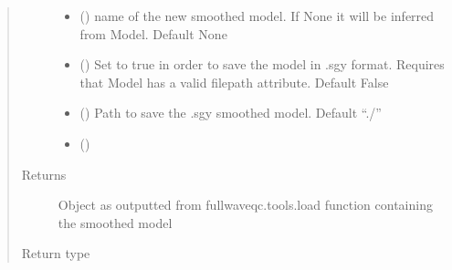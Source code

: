\documentclass[letterpaper,10pt,english]{sphinxmanual}
\begin{document}
\begin{fulllineitems}
\begin{quote}
\begin{description}
\begin{itemize}
\item {} 
 (\sphinxstyleliteralemphasis{\sphinxupquote{, }}) \textendash{} name of the new smoothed model. If None it will be inferred from Model.
Default None

\item {} 
 (\sphinxstyleliteralemphasis{\sphinxupquote{, }}) \textendash{} Set to true in order to save the model in .sgy format. Requires that Model
has a valid filepath attribute. Default False

\item {} 
 (\sphinxstyleliteralemphasis{\sphinxupquote{, }}) \textendash{} Path to save the .sgy smoothed model. Default “./”

\item {} 
 (\sphinxstyleliteralemphasis{\sphinxupquote{, }}) \textendash{} 

\end{itemize}

\item[{Returns}] \leavevmode
{} \textendash{} Object as outputted from fullwaveqc.tools.load function containing the smoothed model

\item[{Return type}] \leavevmode
{\hyperref[\detokenize{index:fullwaveqc.tools.Model}]{}}

\end{description}\end{quote}

\end{fulllineitems}

\label{\detokenize{index:module-fullwaveqc.geom}}
\end{document}
